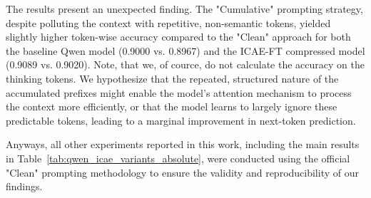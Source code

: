 The results present an unexpected finding.
The "Cumulative" prompting strategy, despite polluting the context with repetitive, non-semantic tokens, yielded slightly higher token-wise accuracy compared to the "Clean" approach for both the baseline Qwen model (0.9000 vs. 0.8967) and the ICAE-FT compressed model (0.9089 vs. 0.9020).
Note, that we, of cource, do not calculate the accuracy on the thinking tokens.
We hypothesize that the repeated, structured nature of the accumulated prefixes might enable the model's attention mechanism to process the context more efficiently, or that the model learns to largely ignore these predictable tokens, leading to a marginal improvement in next-token prediction.

Anyways, all other experiments reported in this work, including the main results in Table~\ref{tab:qwen_icae_variants_absolute}, were conducted using the official "Clean" prompting methodology to ensure the validity and reproducibility of our findings.